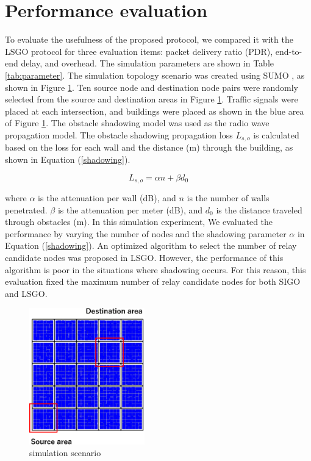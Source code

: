 \documentclass[conference]{IEEEtran}
\begin{document}
\section{Performance evaluation}
\label{evaluation}
To evaluate the usefulness of the proposed protocol, we compared it with the LSGO protocol for three evaluation items: packet delivery ratio (PDR), end-to-end delay, and overhead.
The simulation parameters are shown in Table \ref{tab:parameter}. 
The simulation topology scenario was created using SUMO \cite{27}, as shown in Figure \ref{fig:scenario}. 
Ten source node and destination node pairs were randomly selected from the source and destination areas in Figure \ref{fig:scenario}.
 Traffic signals were placed at each intersection, and buildings were placed as shown in the blue area of Figure \ref{fig:scenario}. 
The obstacle shadowing model \cite{20} was used as the radio wave propagation model. The obstacle shadowing propagation loss $L_{s,o}$ is calculated based on the loss for each wall and the distance (m) through the building, as shown in Equation (\ref{shadowing}).

\begin{equation}
\label{shadowing}
L_{s,o} = \alpha n  + \beta d_0
\end{equation}

where $\alpha$ is the attenuation per wall (dB), and $n$ is the number of walls penetrated. 
$\beta$ is the attenuation per meter (dB), and $d_0$ is the distance traveled through obstacles (m). 
In this simulation experiment, We evaluated the performance by varying the number of nodes and the shadowing parameter $\alpha$ in Equation (\ref{shadowing}).
An optimized algorithm to select the number of relay candidate nodes was proposed in LSGO. However, the performance of this algorithm is poor in the situations where shadowing occurs. For this reason, this evaluation fixed the maximum number of relay candidate nodes for both SIGO and LSGO.



\begin{figure}[!ht]
\centering
\includegraphics[width=50mm]{figures/scenario.eps}
\caption{simulation scenario }
\label{fig:scenario}
\end{figure}
\end{document}
